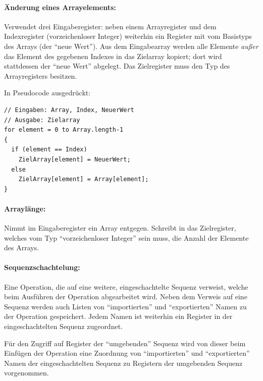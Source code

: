 \documentclass[twoside,a4paper,fleqn,12pt]{article}
\begin{document}
\paragraph{Änderung eines Arrayelements:} Verwendet drei Eingaberegister: neben einem Arrayregister und dem Indexregister (vorzeichenloser Integer)
weiterhin ein Register mit vom Basistyps des Arrays (der "`neue Wert"').
Aus dem Eingabearray werden alle Elemente \emph{außer} das Element des gegebenen Indexes in das Zielarray kopiert;
dort wird stattdessen der "`neue Wert"' abgelegt. Das Zielregister muss den Typ des Arrayregisters besitzen.

In Pseudocode ausgedrückt:
\begin{lstlisting}
// Eingaben: Array, Index, NeuerWert
// Ausgabe: Zielarray
for element = 0 to Array.length-1
{
  if (element == Index)
    ZielArray[element] = NeuerWert;
  else
    ZielArray[element] = Array[element];
}
\end{lstlisting}

\paragraph{Arraylänge:} Nimmt im Eingaberegister ein Array entgegen. Schreibt in das Zielregister, welches vom Typ "`vorzeichenloser Integer"' sein muss,
die Anzahl der Elemente des Arrays.

\paragraph{Sequenzschachtelung:} Eine Operation, die auf eine weitere, eingeschachtelte Sequenz verweist, welche beim Ausführen der Operation abgearbeitet wird.
Neben dem Verweis auf eine Sequenz werden auch Listen von "`importierten"' und "`exportierten"' Namen zu der Operation gespeichert.
Jedem Namen ist weiterhin ein Register in der eingeschachtelten Sequenz zugeordnet.

Für den Zugriff auf Register der "`umgebenden"' Sequenz wird von dieser 
beim Einfügen der Operation eine Zuordnung von "`importierten"' und "`exportierten"' Namen der
eingeschachtelten Sequenz zu Registern der umgebenden Sequenz vorgenommen. 
\end{document}
